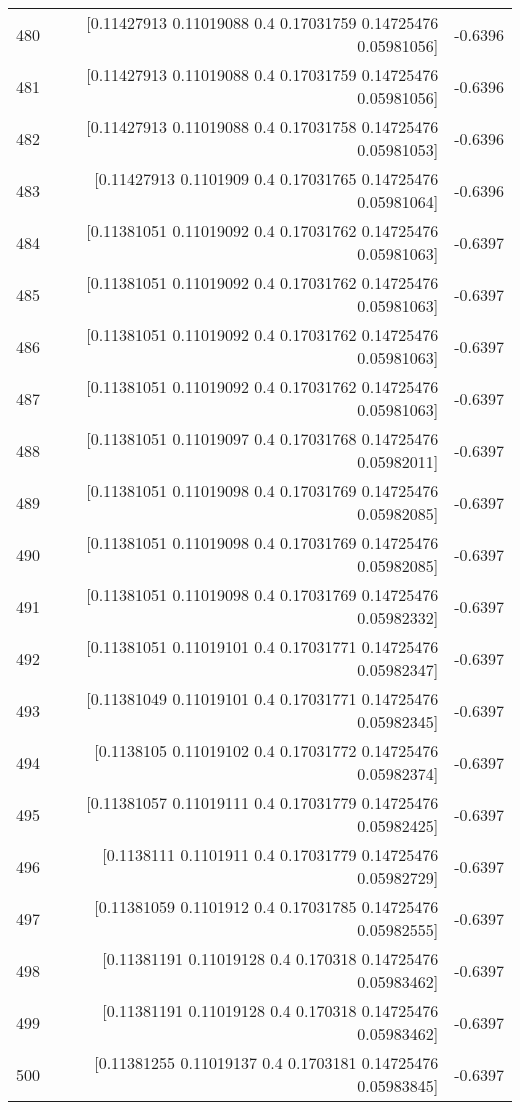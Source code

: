 \begin{longtable}{lrr}
480 & [0.11427913 0.11019088 0.4        0.17031759 0.14725476 0.05981056] & -0.6396 \\
481 & [0.11427913 0.11019088 0.4        0.17031759 0.14725476 0.05981056] & -0.6396 \\
482 & [0.11427913 0.11019088 0.4        0.17031758 0.14725476 0.05981053] & -0.6396 \\
483 & [0.11427913 0.1101909  0.4        0.17031765 0.14725476 0.05981064] & -0.6396 \\
484 & [0.11381051 0.11019092 0.4        0.17031762 0.14725476 0.05981063] & -0.6397 \\
485 & [0.11381051 0.11019092 0.4        0.17031762 0.14725476 0.05981063] & -0.6397 \\
486 & [0.11381051 0.11019092 0.4        0.17031762 0.14725476 0.05981063] & -0.6397 \\
487 & [0.11381051 0.11019092 0.4        0.17031762 0.14725476 0.05981063] & -0.6397 \\
488 & [0.11381051 0.11019097 0.4        0.17031768 0.14725476 0.05982011] & -0.6397 \\
489 & [0.11381051 0.11019098 0.4        0.17031769 0.14725476 0.05982085] & -0.6397 \\
490 & [0.11381051 0.11019098 0.4        0.17031769 0.14725476 0.05982085] & -0.6397 \\
491 & [0.11381051 0.11019098 0.4        0.17031769 0.14725476 0.05982332] & -0.6397 \\
492 & [0.11381051 0.11019101 0.4        0.17031771 0.14725476 0.05982347] & -0.6397 \\
493 & [0.11381049 0.11019101 0.4        0.17031771 0.14725476 0.05982345] & -0.6397 \\
494 & [0.1138105  0.11019102 0.4        0.17031772 0.14725476 0.05982374] & -0.6397 \\
495 & [0.11381057 0.11019111 0.4        0.17031779 0.14725476 0.05982425] & -0.6397 \\
496 & [0.1138111  0.1101911  0.4        0.17031779 0.14725476 0.05982729] & -0.6397 \\
497 & [0.11381059 0.1101912  0.4        0.17031785 0.14725476 0.05982555] & -0.6397 \\
498 & [0.11381191 0.11019128 0.4        0.170318   0.14725476 0.05983462] & -0.6397 \\
499 & [0.11381191 0.11019128 0.4        0.170318   0.14725476 0.05983462] & -0.6397 \\
500 & [0.11381255 0.11019137 0.4        0.1703181  0.14725476 0.05983845] & -0.6397 \\
\end{longtable}